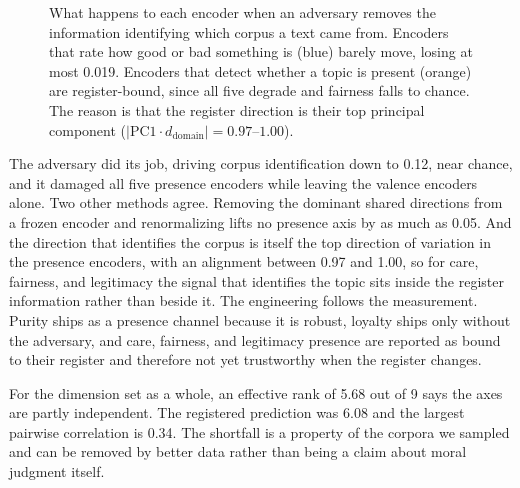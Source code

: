 \documentclass[journal]{IEEEtran}
\begin{document}
\begin{figure}[t]
\caption{What happens to each encoder when an adversary removes the
information identifying which corpus a text came from. Encoders that rate
how good or bad something is (blue) barely move, losing at most 0.019.
Encoders that detect whether a topic is present (orange) are
register-bound, since all five degrade and fairness falls to chance. The
reason is that the register direction is their top principal component
($|\mathrm{PC1}\cdot d_{\text{domain}}| = 0.97$--$1.00$).}
\label{fig:dissociation}
\end{figure}

The adversary did its job, driving corpus identification down to 0.12, near
chance, and it damaged all five presence encoders while leaving the valence
encoders alone. Two other methods agree. Removing the dominant shared
directions from a frozen encoder and renormalizing lifts no presence axis by
as much as 0.05. And the direction that identifies the corpus is itself the
top direction of variation in the presence encoders, with an alignment
between 0.97 and 1.00, so for care, fairness, and legitimacy the signal that
identifies the topic sits inside the register information rather than beside
it. The engineering follows the measurement. Purity ships as a presence
channel because it is robust, loyalty ships only without the adversary, and
care, fairness, and legitimacy presence are reported as bound to their
register and therefore not yet trustworthy when the register changes.

For the dimension set as a whole, an effective rank of 5.68 out of 9 says the
axes are partly independent. The registered prediction was 6.08 and the
largest pairwise correlation is 0.34. The shortfall is a property of the
corpora we sampled and can be removed by better data rather than being a
claim about moral judgment itself.
\end{document}
